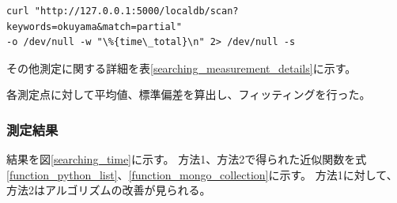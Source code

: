 { \small
\begin{lstlisting}
curl "http://127.0.0.1:5000/localdb/scan?keywords=okuyama&match=partial" 
-o /dev/null -w "\%{time\_total}\n" 2> /dev/null -s
\end{lstlisting}
}

その他測定に関する詳細を表\ref{searching_measurement_details}に示す。

\begin{table}[tbp]
\begin{center}
\caption[検索機能処理時間測定の詳細]{検索機能処理時間測定の詳細。測定を行った試験結果数、回数、キーワード、検索モード、検索情報の詳細を示している。}
\label{searching_measurement_details}
\end{center}
\end{table}

各測定点に対して平均値、標準偏差を算出し、フィッティングを行った。

\subsubsection{測定結果}

結果を図\ref{searching_time}に示す。
方法1、方法2で得られた近似関数を式\ref{function_python_list}、\ref{function_mongo_collection}に示す。
方法1に対して、方法2はアルゴリズムの改善が見られる。

